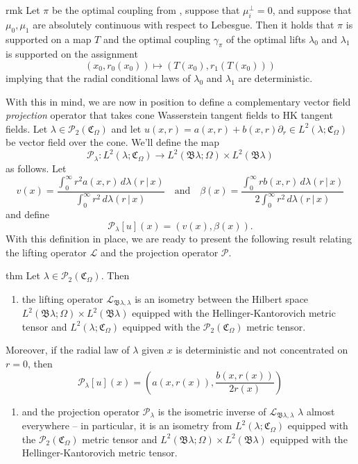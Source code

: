 \documentclass[11pt]{article}
\begin{document}
\begin{restatable}{rmk}{} \label{clancy coupling supported on a map}
    Let $\pi$ be the optimal coupling from , suppose that $\mu_i^\perp = 0$, and suppose that $\mu_0, \mu_1$ are absolutely continuous with respect to Lebesgue. Then it holds that $\pi$ is supported on a map $T$ and the optimal coupling $\gamma_\pi$ of the optimal lifts $\lambda_0$ and $\lambda_1$ is supported on the assignment
    \[(x_0, r_0(x_0)) \mapsto (T(x_0), r_1(T(x_0))) \]
    implying that the radial conditional laws of $\lambda_0$ and $\lambda_1$ are deterministic. 
\end{restatable} 
\noindent With this in mind, we are now in position to define a complementary vector field \textit{projection} operator that takes cone Wasserstein tangent fields to HK tangent fields. Let $\lambda \in \mathcal{P}_2(\mathfrak{C}_\Omega)$ and let $u(x,r) = a(x,r) + b(x,r)\partial_r \in L^2(\lambda; \mathfrak{C}_\Omega)$ be vector field over the cone. We'll define the map  
\[\mathcal{P}_{\lambda}: L^2(\lambda; \mathfrak{C}_\Omega) \rightarrow L^2(\mathfrak{B}\lambda; \Omega) \times L^2(\mathfrak{B}\lambda) \]
as follows. Let 
\[v(x) = \frac{\int_{0}^\infty r^2a(x,r) \, d\lambda(r\,|\,x)}{\int_0^\infty r^2 \,d\lambda(r\,| \,x)} \quad \text{and} \quad \beta(x) = \frac{\int_0^\infty rb(x,r) \,d\lambda(r\, | \, x)}{2\int_0^\infty r^2 \,d\lambda(r\,| \,x)}\]
and define
\[\mathcal{P}_\lambda[u](x) = (v(x), \beta(x)).\]
With this definition in place, we are ready to present the following result relating the lifting operator $\mathcal{L}$ and the projection operator $\mathcal{P}.$
\begin{restatable}{thm}{} \label{isometry}
    Let $\lambda \in \mathcal{P}_2(\mathfrak{C}_\Omega).$ Then
    \begin{enumerate}[label=(\alph*)]
        \item the lifting operator $\mathcal{L}_{\mathfrak{B}\lambda, \lambda}$ is an isometry between the Hilbert space $L^2(\mathfrak{B}\lambda; \Omega) \times L^2(\mathfrak{B}\lambda)$ equipped with the Hellinger-Kantorovich metric tensor and $L^2(\lambda; \mathfrak{C}_\Omega)$ equipped with the $\mathcal{P}_2(\mathfrak{C}_\Omega)$ metric tensor.
    \end{enumerate}  Moreover, if the radial law of $\lambda$ given $x$ is deterministic and not concentrated on $r = 0$, then 
    \[\mathcal{P}_\lambda[u](x) = \left(a(x, r(x)), \frac{b(x, r(x))}{2r(x)}\right)\]
    \begin{enumerate}[resume*]
        \item and the projection operator $\mathcal{P}_\lambda$ is the isometric inverse of $\mathcal{L}_{\mathfrak{B}\lambda, \lambda}$ $\lambda$ almost everywhere -- in particular, it is an isometry from $L^2(\lambda; \mathfrak{C}_\Omega)$ equipped with the $\mathcal{P}_2(\mathfrak{C}_\Omega)$ metric tensor and $L^2(\mathfrak{B}\lambda; \Omega) \times L^2(\mathfrak{B}\lambda)$ equipped with the Hellinger-Kantorovich metric tensor. 
    \end{enumerate}
\end{restatable}
\end{document}
